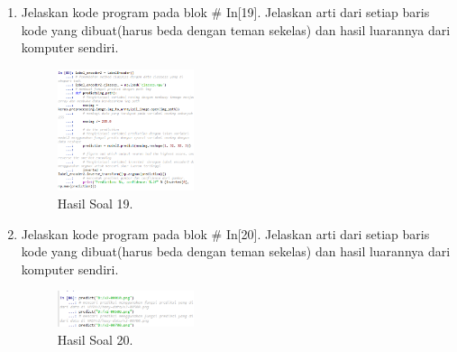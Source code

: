 \begin{enumerate}
    \item Jelaskan kode program pada blok \# In[19]. Jelaskan arti dari setiap baris kode yang dibuat(harus beda dengan teman sekelas) dan hasil luarannya dari komputer sendiri.
    \hfill\break
    
    \begin{figure}[H]
        \centering
            \includegraphics[width=4cm]{figures/1174077/7/praktek_19.PNG}
            \caption{Hasil Soal 19.}
        \end{figure}
        
    \item Jelaskan kode program pada blok \# In[20]. Jelaskan arti dari setiap baris kode yang dibuat(harus beda dengan teman sekelas) dan hasil luarannya dari komputer sendiri.
    \hfill\break
    
    \begin{figure}[H]
        \centering
            \includegraphics[width=4cm]{figures/1174077/7/praktek_20.PNG}
            \caption{Hasil Soal 20.}
        \end{figure}
        
\end{enumerate}

